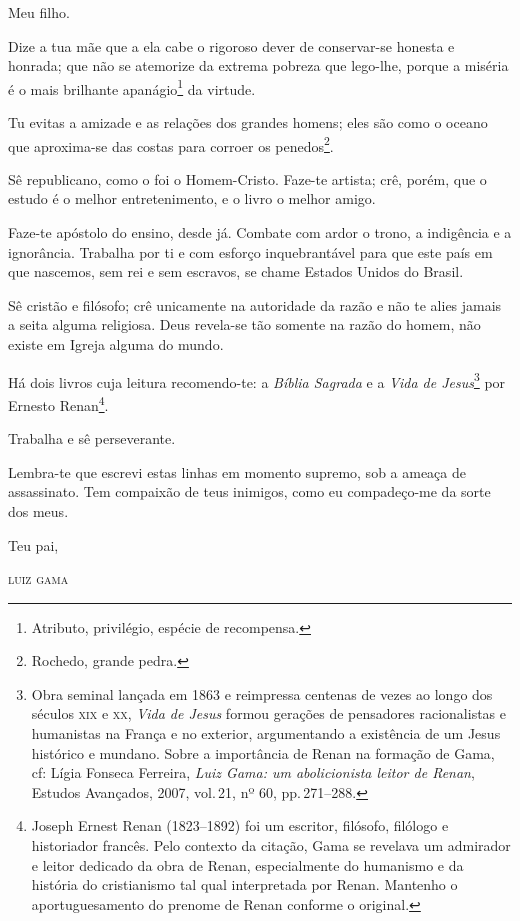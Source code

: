 Meu filho.

Dize a tua mãe que a ela cabe o rigoroso dever de conservar-se honesta e
honrada; que não se atemorize da extrema pobreza que lego-lhe, porque a
miséria é o mais brilhante apanágio\footnote{ Atributo, privilégio,
  espécie de recompensa.} da virtude.

Tu evitas a amizade e as relações dos grandes homens; eles são como o
oceano que aproxima-se das costas para corroer os penedos\footnote{
  Rochedo, grande pedra.}.

Sê republicano, como o foi o Homem-Cristo. Faze-te artista; crê, porém,
que o estudo é o melhor entretenimento, e o livro o melhor amigo.

Faze-te apóstolo do ensino, desde já. Combate com ardor o trono, a
indigência e a ignorância. Trabalha por ti e com esforço inquebrantável
para que este país em que nascemos, sem rei e sem escravos, se chame
Estados Unidos do Brasil.

Sê cristão e filósofo; crê unicamente na autoridade da razão e não te
alies jamais a seita alguma religiosa. Deus revela-se tão somente na
razão do homem, não existe em Igreja alguma do mundo.

Há dois livros cuja leitura recomendo-te: a \emph{Bíblia Sagrada} e a
\emph{Vida de Jesus}\footnote{Obra seminal lançada em 1863 e
  reimpressa centenas de vezes ao longo dos séculos \textsc{xix} e \textsc{xx}, \emph{Vida
  de Jesus} formou gerações de pensadores racionalistas e humanistas na
  França e no exterior, argumentando a existência de um Jesus histórico
  e mundano. Sobre a importância de Renan na formação de Gama, cf: Lígia
  Fonseca Ferreira, \emph{Luiz Gama: um abolicionista leitor de Renan},
  Estudos Avançados, 2007, vol.\,21, nº 60, pp.\,271--288.} por Ernesto
Renan\footnote{ Joseph Ernest Renan (1823--1892) foi um escritor,
  filósofo, filólogo e historiador francês. Pelo contexto da citação,
  Gama se revelava um admirador e leitor dedicado da obra de Renan,
  especialmente do humanismo e da história do cristianismo tal qual
  interpretada por Renan. Mantenho o aportuguesamento do prenome de
  Renan conforme o original.}.

Trabalha e sê perseverante.

Lembra-te que escrevi estas linhas em momento supremo, sob a ameaça de
assassinato. Tem compaixão de teus inimigos, como eu compadeço-me da
sorte dos meus.

\begin{flushright}
Teu pai,

\textsc{luiz gama}
\end{flushright}


